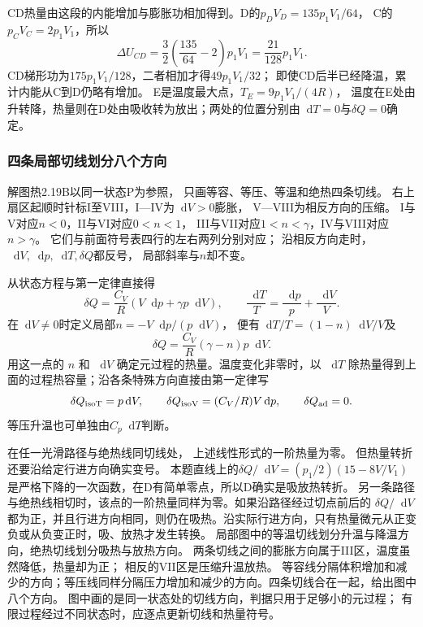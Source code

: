\documentclass[UTF8,fontset=fandol,a4paper,11pt]{ctexart}
\newcommand{\dd}{\mathop{}\!\mathrm{d}}
\begin{document}
CD热量由这段的内能增加与膨胀功相加得到。D的$p_DV_D=135p_1V_1/64$，
C的$p_CV_C=2p_1V_1$，所以
\[
\Delta U_{CD}=\frac32\left(\frac{135}{64}-2\right)p_1V_1
=\frac{21}{128}p_1V_1.
\]
CD梯形功为$175p_1V_1/128$，二者相加才得$49p_1V_1/32$；
即使CD后半已经降温，累计内能从C到D仍略有增加。
E是温度最大点，$T_E=9p_1V_1/(4R)$，
温度在E处由升转降，热量则在D处由吸收转为放出；两处的位置分别由$\dd T=0$与$\delta Q=0$确定。

\subsubsection*{四条局部切线划分八个方向}
解图热2.19B以同一状态P为参照，
只画等容、等压、等温和绝热四条切线。
右上扇区起顺时针标I至VIII，I—IV为$\dd V>0$膨胀，
V—VIII为相反方向的压缩。
I与V对应$n<0$，II与VI对应$0<n<1$，
III与VII对应$1<n<\gamma$，IV与VIII对应$n>\gamma$。
它们与前面符号表四行的左右两列分别对应；
沿相反方向走时，$\dd V,\dd p,\dd T,\delta Q$都反号，
局部斜率与$n$却不变。

从状态方程与第一定律直接得
\[
\delta Q=\frac{C_V}{R}(V\dd p+\gamma p\dd V),\qquad
\frac{\dd T}{T}=\frac{\dd p}{p}+\frac{\dd V}{V}.
\]
在$\dd V\ne0$时定义局部$n=-V\dd p/(p\dd V)$，
便有$\dd T/T=(1-n)\dd V/V$及
\[
\delta Q=\frac{C_V}{R}(\gamma-n)p\dd V.
\]
用这一点的 $n$ 和 $\dd V$ 确定元过程的热量。温度变化非零时，以 $\dd T$ 除热量得到上面的过程热容量；沿各条特殊方向直接由第一定律写
\[
\delta Q_{\rm isoT}=p\dd V,\qquad
\delta Q_{\rm isoV}=(C_V/R)V\dd p,\qquad
\delta Q_{\rm ad}=0.
\]
等压升温也可单独由$C_p\dd T$判断。

在任一光滑路径与绝热线同切线处，
上述线性形式的一阶热量为零。
但热量转折还要沿给定行进方向确实变号。
本题直线上的$\delta Q/\dd V=(p_1/2)(15-8V/V_1)$
是严格下降的一次函数，在D有简单零点，所以D确实是吸放热转折。
另一条路径与绝热线相切时，该点的一阶热量同样为零。如果沿路径经过切点前后的 $\delta Q/\dd V$ 都为正，并且行进方向相同，则仍在吸热。沿实际行进方向，只有热量微元从正变负或从负变正时，吸、放热才发生转换。
局部图中的等温切线划分升温与降温方向，绝热切线划分吸热与放热方向。
两条切线之间的膨胀方向属于III区，温度虽然降低，热量却为正；
相反的VII区是压缩升温放热。
等容线分隔体积增加和减少的方向；等压线同样分隔压力增加和减少的方向。四条切线合在一起，给出图中八个方向。
图中画的是同一状态处的切线方向，判据只用于足够小的元过程；
有限过程经过不同状态时，应逐点更新切线和热量符号。




\end{document}
